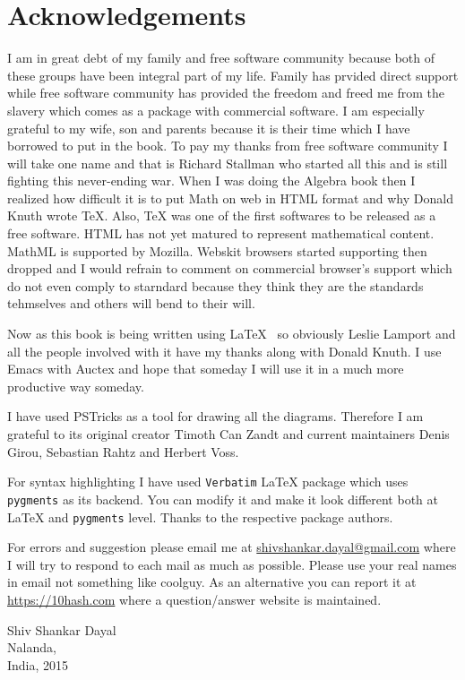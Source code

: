 \section{Acknowledgements}
I am in great debt of my family and free software community because both of
these groups have been integral part of my life. Family has prvided direct
support while free software community has provided the freedom and freed me
from the slavery which comes as a package with commercial software. I am
especially grateful to my wife, son and parents because it is their time which
I have borrowed to put in the book. To pay my thanks from free software
community  I will take one name and that is Richard Stallman who started all
this  and is still fighting this never-ending war. When I was doing the Algebra
book then I realized how difficult it is to put Math on web in HTML format and
why Donald Knuth wrote \TeX{}. Also, \TeX{} was one of the first softwares to
be released as a free software. HTML has not yet matured to represent
mathematical content. MathML is supported by Mozilla. Webskit browsers started
supporting 
then dropped and I would refrain to comment on commercial browser's support
which do not even comply to starndard because they think they are the standards
tehmselves and others will bend to their will.

Now as this book is being written using \LaTeX{}~ so obviously Leslie Lamport
and all the people involved with it have my thanks along with Donald Knuth. I
use Emacs with Auctex and hope that someday I will use it in a much more
productive way someday.

I have used PSTricks as a tool for drawing all the diagrams. Therefore I am
grateful to its original creator Timoth Can Zandt and current maintainers Denis
Girou, Sebastian Rahtz and Herbert Voss.

For syntax highlighting I have used \texttt{Verbatim} \LaTeX{} package which uses
\texttt{pygments} as its backend. You can modify it and make it look different
both at \LaTeX{} and \texttt{pygments} level. Thanks to the respective package
authors.

For errors and suggestion please email me at
\href{mailto:shivshankar.dayal@gmail.com}{shivshankar.dayal@gmail.com} where I
will try to respond to each mail as
much as possible. Please use your real names in email not something like
coolguy. As an alternative you can report it at
\url{https://10hash.com} where a question/answer website is maintained.
\begin{flushright}
Shiv Shankar Dayal\\
Nalanda,\\
India, 2015
\end{flushright}
